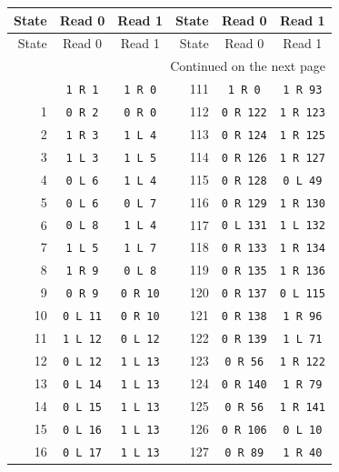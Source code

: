 \begingroup\small
\renewcommand{\arraystretch}{0.9}
\setlength{\tabcolsep}{9pt}
\begin{longtable}{@{}rcc@{\hspace{14mm}}rcc@{}}
\toprule
State & Read 0 & Read 1 & State & Read 0 & Read 1\\
\midrule\endfirsthead
\toprule
State & Read 0 & Read 1 & State & Read 0 & Read 1\\
\midrule\endhead
\midrule\multicolumn{6}{r}{\small Continued on the next page}\\\endfoot
\bottomrule\endlastfoot
0 & \texttt{1 R 1} & \texttt{1 R 0} & 111 & \texttt{1 R 0} & \texttt{1 R 93}\\
1 & \texttt{0 R 2} & \texttt{0 R 0} & 112 & \texttt{0 R 122} & \texttt{1 R 123}\\
2 & \texttt{1 R 3} & \texttt{1 L 4} & 113 & \texttt{0 R 124} & \texttt{1 R 125}\\
3 & \texttt{1 L 3} & \texttt{1 L 5} & 114 & \texttt{0 R 126} & \texttt{1 R 127}\\
4 & \texttt{0 L 6} & \texttt{1 L 4} & 115 & \texttt{0 R 128} & \texttt{0 L 49}\\
5 & \texttt{0 L 6} & \texttt{0 L 7} & 116 & \texttt{0 R 129} & \texttt{1 R 130}\\
6 & \texttt{0 L 8} & \texttt{1 L 4} & 117 & \texttt{0 L 131} & \texttt{1 L 132}\\
7 & \texttt{1 L 5} & \texttt{1 L 7} & 118 & \texttt{0 R 133} & \texttt{1 R 134}\\
8 & \texttt{1 R 9} & \texttt{0 L 8} & 119 & \texttt{0 R 135} & \texttt{1 R 136}\\
9 & \texttt{0 R 9} & \texttt{0 R 10} & 120 & \texttt{0 R 137} & \texttt{0 L 115}\\
10 & \texttt{0 L 11} & \texttt{0 R 10} & 121 & \texttt{0 R 138} & \texttt{1 R 96}\\
11 & \texttt{1 L 12} & \texttt{0 L 12} & 122 & \texttt{0 R 139} & \texttt{1 L 71}\\
12 & \texttt{0 L 12} & \texttt{1 L 13} & 123 & \texttt{0 R 56} & \texttt{1 R 122}\\
13 & \texttt{0 L 14} & \texttt{1 L 13} & 124 & \texttt{0 R 140} & \texttt{1 R 79}\\
14 & \texttt{0 L 15} & \texttt{1 L 13} & 125 & \texttt{0 R 56} & \texttt{1 R 141}\\
15 & \texttt{0 L 16} & \texttt{1 L 13} & 126 & \texttt{0 R 106} & \texttt{0 L 10}\\
16 & \texttt{0 L 17} & \texttt{1 L 13} & 127 & \texttt{0 R 89} & \texttt{1 R 40}\\

\end{longtable}
